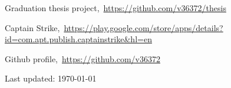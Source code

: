 \documentclass[letterpaper]{article}
\begin{document}
\begin{thebibliography}{99}

Graduation thesis project,\ \url{https://github.com/v36372/thesis}

Captain Strike,\ \url{https://play.google.com/store/apps/details?id=com.apt.publish.captainstrike&hl=en}

Github profile,\ \url{https://github.com/v36372}

\end{thebibliography}

\bigskip

\begin{center}
  \begin{footnotesize}
    Last updated: \today \\
  \end{footnotesize}
\end{center}
\end{document}
